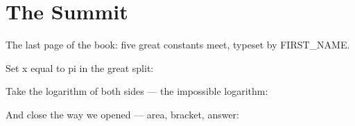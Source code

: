 
\section{The Summit}

The last page of the book: five great constants meet, typeset by {{FIRST_NAME}}.

Set x equal to pi in the great split:



Take the logarithm of both sides — the impossible logarithm:



And close the way we opened — area, bracket, answer:


